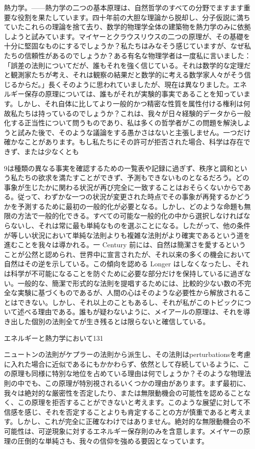 \documentclass[a4paper,11pt,openany]{ltjsbook}
\begin{document}
熱力学。——熱力学の二つの基本原理は、自然哲学のすべての分野でますます重要な役割を果たしています。四十年前の大胆な理論から脱却し、分子仮説に満ちていたこれらの理論を捨て去り、数学的物理学全体の建築物を熱力学のみに依拠しようと試みています。マイヤーとクラウスリウスの二つの原理が、その基礎を十分に堅固なものにするでしょうか？私たちはみなそう感じていますが、なぜ私たちの信頼性があるのでしょうか？ある有名な物理学者は一度私に言いました：「誤差の法則についてだが、誰もそれを強く信じている。それは数学的な定理だと観測家たちが考え、それは観察の結果だと数学的に考える数学家人々がそう信じるからだ。」長くそのように思われていましたが、現在は異なりました。エネルギー保存の原理については、誰もがそれが実験的事実であることを知っています。しかし、それ自体に比してより一般的かつ精密な性質を属性付ける権利は何故私たちは持っているのでしょうか？これは、我々が日々経験的データから一般化する正当性について問うものであり、私は多くの哲学者がこの問題を解決しようと試みた後で、そのような議論をする愚かさはないと主張しません。一つだけ確かなことがあります。もし私たちにその許可が拒否された場合、科学は存在できず、または少なくとも

9は種類の異なる事実を確認するための一覧表や記録に過ぎず、秩序と調和という私たちの欲求を満たすことができず、予測もできないものとなるだろう。どの事象が生じたかに関わる状況が再び完全に一致することはおそらくないからである。従って、わずかな一つの状況が変更された時点でその事象が再発するかどうかを予測するために最初の一般的化が必要となる。しかし、どのような命題も無限の方法で一般的化できる。すべての可能な一般的化の中から選択しなければならないし、それは常に最も単純なものを選ぶことになる。したがって、他の条件が等しい状況において単純な法則よりも複雑な法則がより確実であるという道を進むことを我々は導かれる。一 Century 前には、自然は簡潔さを愛するということが公然と認められ、世界中に宣言されたが、それ以来の多くの機会において自然はその逆を示している。この傾向を認める Longer はしなくなったし、それは科学が不可能になることを防ぐために必要な部分だけを保持しているに過ぎない。一般的な、簡潔で形式的な法則を提唱するためには、比較的少ない数の不完全な実験に基づくものであるが、人間の心はそのような必要性から解放されることはできない。しかし、それ以上のこともあるし、それが私がこのトピックについて述べる理由である。誰もが疑わないように、メイアールの原理は、それを導き出した個別の法則全てが生き残るとは限らないと確信している。

エネルギーと熱力学において131

ニュートンの法則がケプラーの法則から派生し、その法則はperturbationsを考慮に入れた場合に近似であるにもかかわらず、依然として存続しているように、この原理も同様に特別な地位を占めている理由は何でしょうか？そのような物理法則の中でも、この原理が特別視されるいくつかの理由があります。まず最初に、我々は絶対的な厳密性を否定したり、または無限動機会の可能性を認めることなく、この原理を拒否することができないと考えます。このような展望に対して不信感を感じ、それを否定することよりも肯定することの方が慎重であると考えます。しかし、これが完全に正確なわけではありません。絶対的な無限動機会の不可能性は、可逆現象に対するエネルギー保存則のみを含意します。メイヤーの原理の圧倒的な単純さも、我々の信仰を強める要因となっています。
\end{document}
